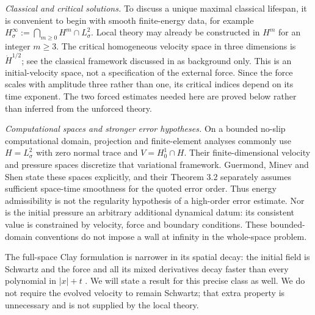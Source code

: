 \documentclass[11pt,a4paper]{article}
\theoremstyle{definition}\newtheorem{definition}[theorem]{Definition}
\theoremstyle{remark}\newtheorem{remark}[theorem]{Remark}
\begin{document}
\emph{Classical and critical solutions.} To discuss a unique maximal classical lifespan, it is convenient to begin with smooth finite-energy data, for example $H^\infty_\sigma:=\bigcap_{m\ge0}H^m\cap L^2_\sigma$. Local theory may already be constructed in $H^m$ for an integer $m\ge3$. The critical homogeneous velocity space in three dimensions is $\dot H^{1/2}$; see the classical framework discussed in \cite{fujita,tao2018} as background only. This is an initial-velocity space, not a specification of the external force. Since the force scales with amplitude three rather than one, its critical indices depend on its time exponent. The two forced estimates needed here are proved below rather than inferred from the unforced theory.

\emph{Computational spaces and stronger error hypotheses.} On a bounded no-slip computational domain, projection and finite-element analyses commonly use $H=L^2_\sigma$ with zero normal trace and $V=H^1_0\cap H$. Their finite-dimensional velocity and pressure spaces discretize that variational framework. Guermond, Minev and Shen \cite[Section 2]{gms} state these spaces explicitly, and their Theorem 3.2 separately assumes sufficient space-time smoothness for the quoted error order. Thus energy admissibility is not the regularity hypothesis of a high-order error estimate. Nor is the initial pressure an arbitrary additional dynamical datum: its consistent value is constrained by velocity, force and boundary conditions. These bounded-domain conventions do not impose a wall at infinity in the whole-space problem.

The full-space Clay formulation is narrower in its spatial decay: the initial field is Schwartz and the force and all its mixed derivatives decay faster than every polynomial in $|x|+t$ \cite[equations (4)--(5)]{clay}. We will state a result for this precise class as well. We do not require the evolved velocity to remain Schwartz; that extra property is unnecessary and is not supplied by the local theory.
\end{document}
